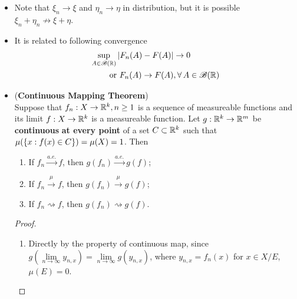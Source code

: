 \documentclass[11pt]{article}
\begin{document}
\begin{itemize}
\item \begin{remark}
Note that $\xi_{n} \rightarrow \xi$ and $\eta_{n} \rightarrow \eta$ in distribution, but it is possible $\xi_{n}+\eta_{n} \not\rightarrow \xi+\eta$.
\end{remark}


\item \begin{remark}
It is related to following convergence
\begin{align*}
\sup_{A\in {\mathscr B}({\mathbb R})}\left\lvert  F_{n}(A) - F(A) \right\rvert &\rightarrow 0\\
\text{or }F_{n}(A) \rightarrow  F(A) &, \forall\, A\in {\mathscr B}({\mathbb R})
\end{align*}
\end{remark}

\item \begin{theorem} (\textbf{Continuous Mapping Theorem}) \citep{van2000asymptotic}\\
Suppose that $f_n : X \rightarrow {\mathbb R}^{k}, n\ge 1$ is a sequence of measureable functions and its limit $f:  X \rightarrow {\mathbb R}^{k}$ is a measureable function. Let $g: {\mathbb R}^{k} \rightarrow {\mathbb R}^{m}$ be \textbf{continuous} \textbf{at every point} of a set $C\subset {\mathbb R}^{k}$ such that $\mu(\left\{x: f(x)\in C\right\})= \mu(X)= 1$. Then 
\begin{enumerate}
\item If $f_{n} \stackrel{a.e.}{\rightarrow} f$, then $g(f_{n}) \stackrel{a.e.}{\rightarrow}g(f)$;
\item If $f_{n} \stackrel{\mu}{\rightarrow} f$, then $g(f_{n}) \stackrel{\mu}{\rightarrow}g(f)$;
\item If $f_{n} \rightsquigarrow f$, then $g(f_{n})\rightsquigarrow g(f)$.
\end{enumerate}
\end{theorem}
\begin{proof}
\begin{enumerate}
\item Directly by the property of continuous map, since $g(\lim\limits_{n\rightarrow \infty}y_{n,x})=\lim\limits_{n\rightarrow \infty}g(y_{n,x}) $, where $y_{n,x}= f_{n}(x)$ for $x\in X/E$, $\mu(E)=0$. 


\end{enumerate}
\end{proof}
\end{itemize}
\end{document}
